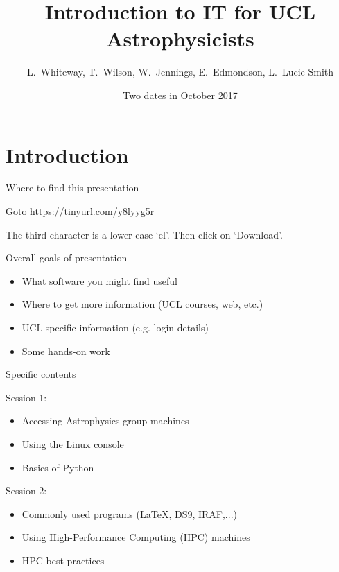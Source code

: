 \documentclass{beamer}
\title[IT Workshops] %
{Introduction to IT for UCL Astrophysicists}
\author{L.~Whiteway, T.~Wilson, W.~Jennings, E.~Edmondson, L.~Lucie-Smith}
\institute[UCL]
{
  Department of Physics and Astronomy\\
  University College London
}
\date
{Two dates in October 2017}
\begin{document}
\frame{\titlepage}

\section{Introduction}

\begin{frame}{Where to find this presentation}
  \begin{block}{}
    Goto \url{https://tinyurl.com/y8lyyg5r}
  \end{block}
  \begin{block}{}
    The third character is a lower-case `el'.
    Then click on `Download'.
  \end{block}
\end{frame}


\begin{frame}{Overall goals of presentation}
  \begin{itemize}
    \item What software you might find useful
    \item Where to get more information (UCL courses, web, etc.)
    \item UCL-specific information (e.g. login details)
    \item Some hands-on work
  \end{itemize}
\end{frame}

\begin{frame}{Specific contents}

  \begin{block}{Session 1:}
    \begin{itemize}
      \item Accessing Astrophysics group machines
      \item Using the Linux console
      \item Basics of Python
    \end{itemize}
  \end{block}
  
  \begin{block}{Session 2:}
    \begin{itemize}
    \item Commonly used programs (LaTeX, DS9, IRAF,...)
    \item Using High-Performance Computing (HPC) machines
    \item HPC best practices
    \end{itemize}
  \end{block}

\end{frame}
\end{document}
